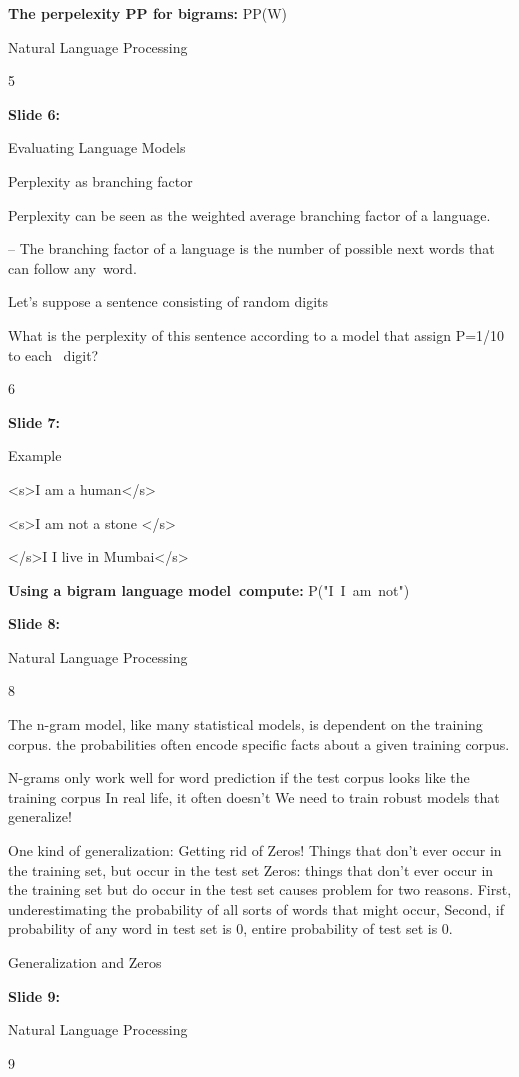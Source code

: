 \documentclass[11pt,a4paper]{article}
\begin{document}
\textbf{The perpelexity PP for bigrams:}   PP(W)

Natural Language Processing

5

\textbf{Slide 6:}

Evaluating Language Models

Perplexity as branching factor

Perplexity can be seen as the weighted average branching factor of a language.

–	The branching factor of a language is the number of possible next words that can follow any word.

Let’s suppose a sentence consisting of random digits

What is the perplexity of this sentence according to a model that assign P=1/10 to each  digit?

6

\textbf{Slide 7:}

Example

<s>I am a human</s>

<s>I am not a stone </s>

</s>I I live in Mumbai</s>

\textbf{Using a bigram language model compute:} P("I I am not")

\textbf{Slide 8:}

Natural Language Processing

8

The n-gram model, like many statistical models, is dependent on the training corpus. the probabilities often encode specific facts about a given training corpus.

N-grams only work well for word prediction if the test corpus looks like the training corpus In real life, it often doesn’t We need to train robust models that generalize!

One kind of generalization: Getting rid of Zeros! Things that don’t ever occur in the training set, but occur in the test set Zeros: things that don’t ever occur in the training set but do occur in the test set causes problem for two reasons. First, underestimating the probability of all sorts of words that might occur, Second, if probability of any word in test set is 0, entire probability of test set is 0.

Generalization and Zeros

\textbf{Slide 9:}

Natural Language Processing

9
\end{document}
